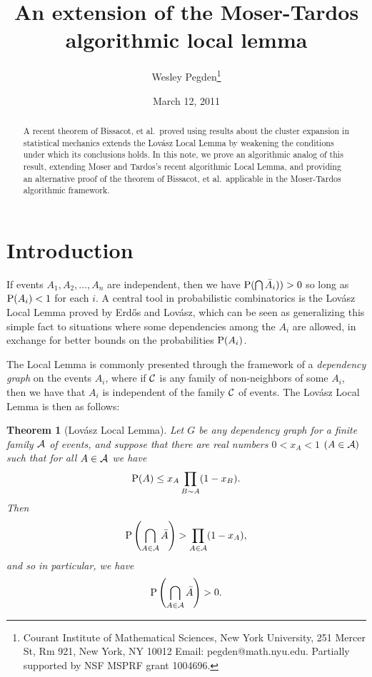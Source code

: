 \documentclass[letterpaper]{article}
\title{An extension of the Moser-Tardos algorithmic local lemma}
\author{Wesley Pegden\footnote{
Courant Institute of Mathematical Sciences, New York University,
251 Mercer St, Rm 921,
New York, NY 10012
Email: pegden@math.nyu.edu.  Partially supported by NSF MSPRF grant 1004696.}
}
\date{March 12, 2011}
\newcommand{\pp}{{\rm P}}
\newcommand{\aaa}{{\cal A}}
\newcommand{\ccc}{{\cal C}}
\newtheorem{theorem}{Theorem}[section]
\theoremstyle{definition}
\theoremstyle{remark}
\begin{document}
\maketitle

\begin{abstract}
  A recent theorem of Bissacot, et al.~proved using results about the cluster expansion in statistical mechanics extends the Lov\'asz Local Lemma by weakening the conditions under which its conclusions holds.  In this note, we prove an algorithmic analog of this result, extending Moser and Tardos's recent algorithmic Local Lemma, and providing an alternative proof of the theorem of Bissacot, et al.~applicable in the Moser-Tardos algorithmic framework.
\end{abstract}

\section{Introduction}
If events $A_1,A_2,\dots,A_n$ are independent, then we have 
$\pp(\bigcap \bar A_i))>0$
so long as $\pp(A_i)<1$ for each $i$.  A central tool in probabilistic combinatorics is the Lov\'asz Local Lemma proved by Erd\H{o}s and Lov\'asz\cite{EL}, which can be seen as generalizing this simple fact to situations where some dependencies among the $A_i$ are allowed, in exchange for better bounds on the probabilities $\pp(A_i)$.

The Local Lemma is commonly presented through the framework of a \emph{dependency graph} on the events $A_i$, where if $\ccc$ is any family of non-neighbors of some $A_i$, then we have that $A_i$ is independent of the family $\ccc$ of events.  The Lov\'asz Local Lemma is then as follows:

\begin{theorem}[Lov\'asz Local Lemma]
  Let $G$ be any dependency graph for a finite family $\aaa$ of events, and suppose that there are real numbers $0<x_A<1$ $(A\in \aaa)$  such that for all $A\in \aaa$ we have
  \begin{equation}
    \pp(A)\leq x_{A}\prod_{B\sim A}(1-x_B).
\label{c.L}
  \end{equation}
Then 
\[
\pp\left(\bigcap_{A\in \aaa}\bar A\right)>\prod_{A\in \aaa}(1-x_A),
\]
and so in particular, we have
\begin{equation}
\pp\left(\bigcap_{A\in \aaa}\bar A\right)>0.
\end{equation}
\end{theorem}
\end{document}
